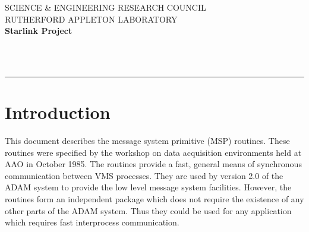 \def\mansemiverbatim{\zmansemiverbatim\frenchspacing\zvobeyspaces}

\let\endmansemiverbatim=\endtrivlist


\thispagestyle{empty}
SCIENCE \& ENGINEERING RESEARCH COUNCIL \hfill \stardocname\\
RUTHERFORD APPLETON LABORATORY\\
{\large\bf Starlink Project\\}
{\large\bf \stardoccategory\ \stardocnumber}
\begin{flushright}
\stardocauthors\\
\stardocdate
\end{flushright}
\vspace{-4mm}
\rule{\textwidth}{0.5mm}
\vspace{5mm}
\begin{center}
{\Large\bf \stardoctitle}
\end{center}
\vspace{5mm}

\setlength{\parskip}{0mm}
\tableofcontents
\setlength{\parskip}{\medskipamount}
\markright{\stardocname}
\newenvironment{cozy}[1]%
{\begin{list}{}{%
\settowidth{\labelwidth}{\large\tt #1}%
\setlength{\labelsep}{5mm}%
\setlength{\leftmargin}{\labelwidth}\addtolength{\leftmargin}{\labelsep}%
\setlength{\parsep}{\medskipamount}%
}}{\end{list}}
\newpage
\section{Introduction}

This document describes the message system primitive (MSP) routines.
These routines were specified by the workshop on data acquisition environments
held at AAO in October 1985. The routines provide a fast, general means of
synchronous communication between VMS processes. They are used by version
2.0 of the ADAM system to provide the low level message system facilities.
However, the routines form an independent package which does not require
the existence of any other parts of the ADAM system. Thus they could be used
for any application which requires fast interprocess communication.

